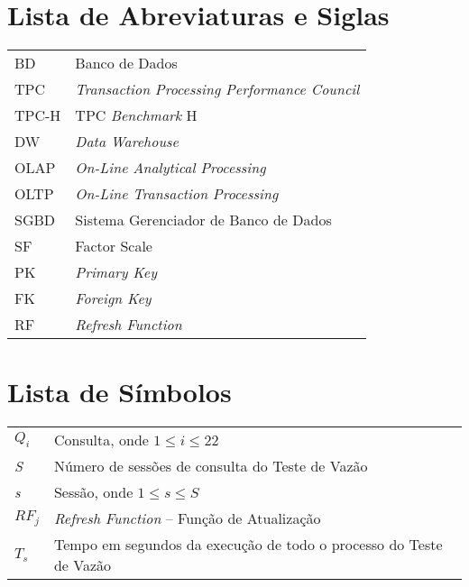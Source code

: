 
\pagebreak
{}
\listoffigures

\pagebreak
{}
\listoftables

\pagebreak
{}
\chapter*{Lista de Abreviaturas e Siglas}
\begin{tabular}{ll}
	BD & Banco de Dados\\
	TPC & \textit{Transaction Processing Performance Council}\\
	TPC-H & TPC \textit{Benchmark} H\\
	DW & \textit{Data Warehouse}\\
	OLAP & \textit{On-Line Analytical Processing}\\
	OLTP & \textit{On-Line Transaction Processing}\\
	SGBD & Sistema Gerenciador de Banco de Dados\\
	SF & Factor Scale\\
	PK & \textit{Primary Key}\\
	FK & \textit{Foreign Key}\\
	RF & \textit{Refresh Function} \\
\end{tabular}

\pagebreak
{}
\chapter*{Lista de Símbolos}
\begin{tabular}{ll}
	$Q_{i}$ & Consulta, onde \mbox{$1 \le i \le 22$}\\
	\textit{S} & Número de sessões de consulta do Teste de Vazão\\
	\textit{s} & Sessão, onde \mbox{$1 \le s \le S$}\\
	$RF_{j}$ & \textit{Refresh Function} -- Função de Atualização\\
	$T_{s}$ & Tempo em segundos da execução de todo o processo do Teste de Vazão\\
\end{tabular}

\pagebreak
{}
\tableofcontents
